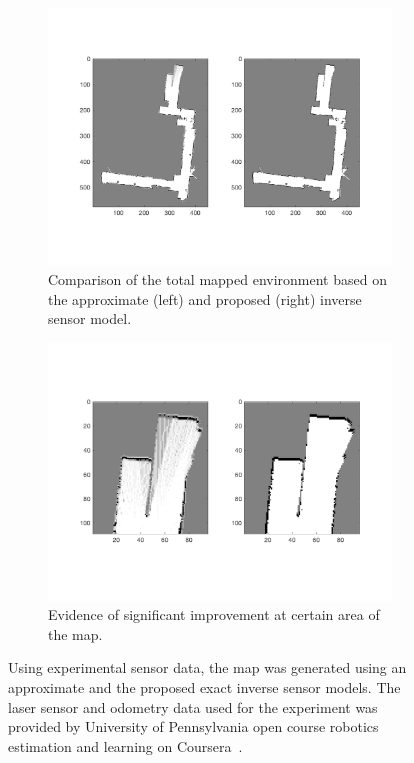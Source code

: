 \documentclass[smallextended]{svjour3}       %
\begin{document}
\begin{figure}[!ht]
    \centering
    \begin{subfigure}[t]{0.8\columnwidth}
        \centering
        \includegraphics[trim={1.5cm 3.5cm 1.5cm 1.5cm},clip,width=\textwidth]{map_comparison.png}
        \caption{Comparison of the total mapped environment based on the approximate (left) and proposed (right) inverse sensor model.}
        \label{fig:penn_map_total}
    \end{subfigure}
    \begin{subfigure}[t]{0.8\columnwidth}
        \centering
        \includegraphics[trim={1.5cm 3.5cm 1.5cm 1.5cm},clip,width=\textwidth]{map_zoom.png}
        \caption{Evidence of significant improvement at certain area of the map.}
        \label{fig:penn_map_zoom}
    \end{subfigure}
    \caption{Using experimental sensor data, the map was generated using an approximate and the proposed exact inverse sensor models. The laser sensor and odometry data used for the experiment was provided by University of Pennsylvania open course robotics estimation and learning on Coursera~\cite{coursera}.}
    \label{fig:penn_map}
\end{figure}
\end{document}

